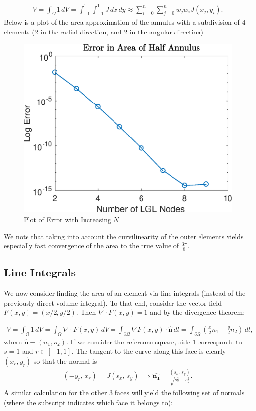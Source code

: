 \documentclass{article}
\begin{document}
  \begin{align*}
    V =  \int_\Omega 1 \, dV = \int_{-1}^1 \int_{-1}^1 J \, dx\,dy \approx \sum_{i = 0}^n \sum_{j=0}^n w_j w_i J(x_j, y_i).
  \end{align*}
  Below is a plot of the area approximation of the annulus with a subdivision of 4 elements (2 in the radial direction, and 2 in the angular direction).
  \begin{figure}[H]
    \centering
    \includegraphics[scale=0.7]{media/GHannulus.eps}
    \caption{Plot of Error with Increasing $N$}
    \label{fig:annulus_plot}
  \end{figure}
\noindent We note that taking into account the curvilinearity of the outer elements yields especially fast convergence of the area to the true value of $\frac{3\pi}{8}$.

\subsection{Line Integrals}
We now consider finding the area of an element via line integrals (instead of the previously direct volume integral). To that end, consider the vector field $F(x,y) = (x/2, y/2)$. Then $\nabla \cdot F(x,y) = 1$ and by the divergence theorem:

  \begin{align*}
    V =  \int_\Omega 1 \, dV = \int_\Omega \nabla \cdot F(x,y) \, dV = \int_{\partial \Omega} \nabla F(x,y) \cdot \hat{\textbf{n}} \, dl = \int_{\partial \Omega} \left( \frac{x}{2}n_1 + \frac{y}{2}n_2 \right)\, dl,
  \end{align*}
where $\hat{\textbf{n}} = (n_1,n_2)$. If we consider the reference square, side 1 corresponds to $s = 1$ and $r \in [-1,1]$. The tangent to the curve along this face is clearly $(x_r,y_r)$ so that the normal is
  \begin{align*}
    (-y_r, \, x_r) = J (s_x, \, s_y) \implies \hat{\boldsymbol{n_1}} = \frac{(s_x, \, s_y)}{\sqrt{s_x^2 + s_y^2}}.
  \end{align*}
A similar calculation for the other 3 faces will yield the following set of normals (where the subscript indicates which face it belongs to):
\end{document}
